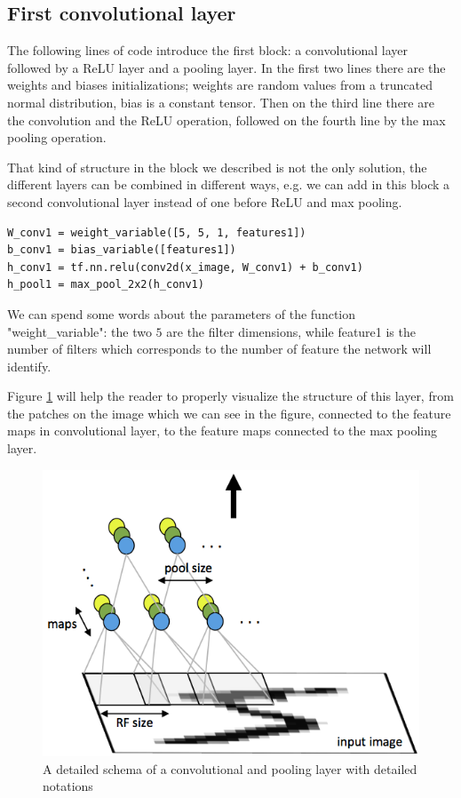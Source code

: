 \subsection{First convolutional layer}

The following lines of code introduce the first block: a convolutional layer followed by a ReLU layer and a pooling layer. In the first two lines there are the weights and biases initializations; weights are random values from a truncated normal distribution, bias is a constant tensor. Then on the third line there are the convolution and the \acs{ReLU} operation, followed on the fourth line by the max pooling operation.

That kind of structure in the block we described is not the only solution, the different layers can be combined in different ways, e.g. we can add in this block a second convolutional layer instead of one before ReLU and max pooling.

\begin{lstlisting}
W_conv1 = weight_variable([5, 5, 1, features1])
b_conv1 = bias_variable([features1])
h_conv1 = tf.nn.relu(conv2d(x_image, W_conv1) + b_conv1)
h_pool1 = max_pool_2x2(h_conv1)
\end{lstlisting}

We can spend some words about the parameters of the function "weight\_variable": the two $5$ are the filter dimensions, while feature1 is the number of filters which corresponds to the number of feature the network will identify.

Figure \ref{fig:conv_layer} will help the reader to properly visualize the structure of this layer, from the patches on the image which we can see in the figure, connected to the feature maps in convolutional layer, to the feature maps connected to the max pooling layer.

\begin{figure}
	\caption{A detailed schema of a convolutional and pooling layer with detailed notations}
	\label{fig:conv_layer}
	\centering
	\includegraphics[width=1\textwidth]{Images/conv_layer}
\end{figure}

